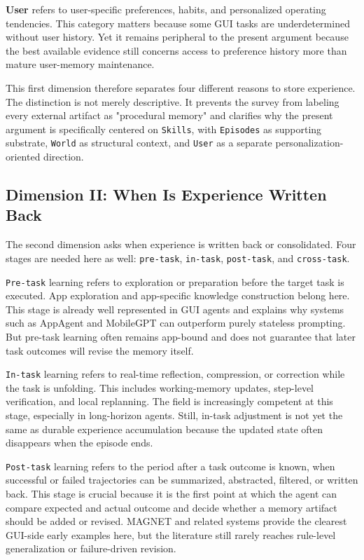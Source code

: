 \documentclass{article}
\begin{document}
\textbf{User} refers to user-specific preferences, habits, and
personalized operating tendencies. This category matters because some
GUI tasks are underdetermined without user history. Yet it remains
peripheral to the present argument because the best available evidence
still concerns access to preference history more than mature user-memory
maintenance.

This first dimension therefore separates four different reasons to store
experience. The distinction is not merely descriptive. It prevents the
survey from labeling every external artifact as "procedural memory" and
clarifies why the present argument is specifically centered on
\texttt{Skills}, with \texttt{Episodes} as supporting substrate,
\texttt{World} as structural context, and \texttt{User} as a separate
personalization-oriented direction.

\subsection{Dimension II: When Is Experience Written Back}\label{42-dimension-ii-when-is-experience-written-back}

The second dimension asks when experience is written back or
consolidated. Four stages are needed here as well: \texttt{pre-task},
\texttt{in-task}, \texttt{post-task}, and \texttt{cross-task}.

\texttt{Pre-task} learning refers to exploration or preparation before
the target task is executed. App exploration and app-specific knowledge
construction belong here. This stage is already well represented in GUI
agents and explains why systems such as AppAgent and MobileGPT can
outperform purely stateless prompting. But pre-task learning often
remains app-bound and does not guarantee that later task outcomes will
revise the memory itself.

\texttt{In-task} learning refers to real-time reflection, compression,
or correction while the task is unfolding. This includes working-memory
updates, step-level verification, and local replanning. The field is
increasingly competent at this stage, especially in long-horizon agents.
Still, in-task adjustment is not yet the same as durable experience
accumulation because the updated state often disappears when the episode
ends.

\texttt{Post-task} learning refers to the period after a task outcome is
known, when successful or failed trajectories can be summarized,
abstracted, filtered, or written back. This stage is crucial because it
is the first point at which the agent can compare expected and actual
outcome and decide whether a memory artifact should be added or revised.
MAGNET and related systems provide the clearest GUI-side early examples
here, but the literature still rarely reaches rule-level generalization
or failure-driven revision.
\end{document}
